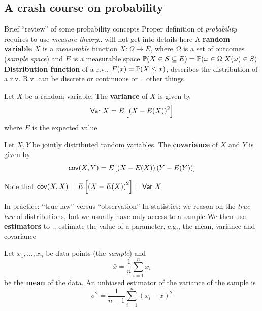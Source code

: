 \documentclass[aspectratio=169]{beamer}\usepackage[]{graphicx}\usepackage[]{xcolor}
\begin{document}
\subsection{A crash course on probability}


\begin{frame}{Brief ``review'' of some probability concepts}
Proper definition of \emph{probability} requires to use \emph{measure theory}.. will not get into details here
\vfill
A \textbf{random variable} $X$ is a \emph{measurable} function $X:\Omega\to E$, where $\Omega$ is a set of outcomes (\emph{sample space}) and $E$ is a measurable space
\vfill
$\mathbb{P}(X\in S\subseteq E) = \mathbb{P}(\omega\in\Omega|X(\omega)\in S)$
\vfill
\textbf{Distribution function} of a r.v., $F(x)=\mathbb{P}(X\leq x)$, describes the distribution of a r.v.
\vfill
R.v. can be discrete or continuous or .. other things. 
\end{frame}

\begin{frame}
\begin{definition}[Variance]
Let $X$ be a random variable. The \textbf{variance} of $X$ is given by
\[
\mathsf{Var}\  X = E\left[\left(X-E(X)\right)^2\right]
\]
where $E$ is the expected value
\end{definition}
\vfill
\begin{definition}[Covariance]
Let $X,Y$ be jointly distributed random variables. The \textbf{covariance} of $X$ and $Y$ is given by
\[
\mathsf{cov} (X,Y) = E\left[\left(X-E(X)\right)\left(Y-E(Y)\right)\right]
\]
\end{definition}
\vfill
Note that $\mathsf{cov}(X,X)=E\left[\left(X-E(X)\right)^2\right] = \mathsf{Var}\  X$
\end{frame}

\begin{frame}{In practice: ``true law'' versus ``observation''}
In statistics: we reason on the \emph{true law} of distributions, but we usually have only access to a sample
\vfill
We then use \textbf{estimators} to .. estimate the value of a parameter, e.g., the mean, variance and covariance
\vfill
\end{frame}
    
\begin{frame}
\begin{definition}
Let $x_1,\ldots,x_n$ be data points (the \emph{sample}) and 
\[
\bar x = \frac 1n \sum_{i=1}^n x_i
\]
be the \textbf{mean} of the data. An unbiased estimator of the variance of the sample is
\[
\sigma^2 = \frac{1}{n-1}\sum_{i=1}^n (x_i-\bar x)^2
\]
\end{definition}
\end{frame}
\end{document}
